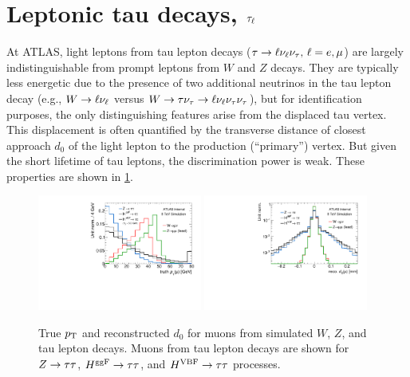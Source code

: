 
\section{Leptonic tau decays, $\tau_\ell$}
\label{sec:taus-leptons}

At ATLAS, light leptons from tau lepton decays ($\tau \rightarrow \ell\nu_\ell\nu_\tau \text{, } \ell = e,\mu$) are largely indistinguishable from prompt leptons from $W$ and $Z$ decays. They are typically less energetic due to the presence of two additional neutrinos in the tau lepton decay (e.g., $W \rightarrow \ell\nu_\ell$ versus $W \rightarrow \tau\nu_\tau \rightarrow \ell\nu_\ell\nu_\tau\nu_\tau$), but for identification purposes, the only distinguishing features arise from the displaced tau vertex. This displacement is often quantified by the transverse distance of closest approach $d_0$ of the light lepton to the production (``primary'') vertex. But given the short lifetime of tau leptons, the discrimination power is weak. These properties are shown in \cref{fig:taus-leptonpt}.

\begin{figure}[tp]
  \centering
  \includegraphics[width=0.48\textwidth]{figures/tauperformance/leptonsfromtausaresoft}
  \includegraphics[width=0.48\textwidth]{figures/tauperformance/leptond0}
  \caption{True $p_{\mathrm{T}}$ and reconstructed $d_0$ for muons from simulated $W$, $Z$, and tau lepton decays. Muons from tau lepton decays are shown for $Z\rightarrow\tau\tau$, $H^{\text{ggF}}\rightarrow\tau\tau$, and $H^{\text{VBF}}\rightarrow\tau\tau$ processes.}
  \label{fig:taus-leptonpt}
\end{figure}


